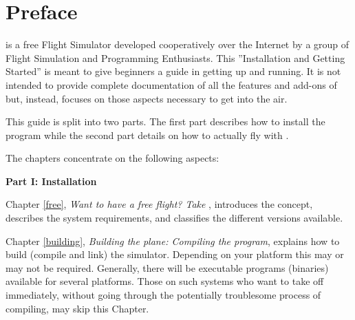 
\chapter*{Preface\label{preface}}

\FlightGear{} is a free Flight Simulator developed cooperatively over the Internet 
by a group of Flight Simulation and Programming Enthusiasts. This ''Installation and Getting
Started'' is meant to give beginners a guide in getting \FlightGear{} up and running. It is not intended to provide complete documentation of all the features and add-ons of \FlightGear{} but, instead, focuses on those aspects necessary to get into the air.  

This guide is split into two parts. The first part describes how to install the program while the second part details on how to actually fly with \FlightGear{}.

The chapters concentrate on the following aspects:
\medskip

\noindent
\textbf{Part I: Installation}
\medskip

 \noindent
Chapter \ref{free}, \textit{Want to have a free flight? Take \FlightGear{}}, introduces
the concept, describes the system requirements, and classifies the different versions
available.
 \medskip

 \noindent
 Chapter \ref{building}, \textit{Building the plane: Compiling the program},
explains how to build (compile and link) the simulator. Depending on your platform this
may or may not be required. Generally, there will be executable programs (binaries)
available for several platforms. Those on such systems who want to take off immediately,
without going through the potentially troublesome process of compiling, may skip this
Chapter.
 \medskip

